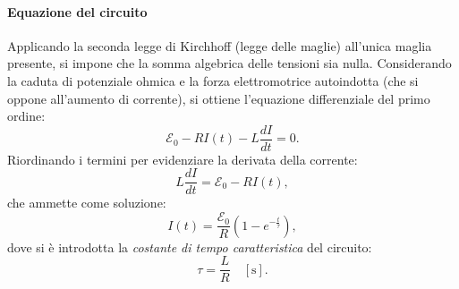 \documentclass[a4paper,11pt]{report}
\begin{document}
\begin{center}

\end{center}

\paragraph{Equazione del circuito}
Applicando la seconda legge di Kirchhoff (legge delle maglie) all'unica maglia presente, si impone che la somma algebrica delle tensioni sia nulla. Considerando la caduta di potenziale ohmica e la forza elettromotrice autoindotta (che si oppone all'aumento di corrente), si ottiene l'equazione differenziale del primo ordine:
\begin{equation}
\mathcal{E}_0 - R I(t) - L \frac{dI}{dt} = 0.
\end{equation}
Riordinando i termini per evidenziare la derivata della corrente:
\begin{equation}
L \frac{dI}{dt} = \mathcal{E}_0 - R I(t),
\end{equation}
che ammette come soluzione:
\begin{equation}
I(t) = \frac{\mathcal{E}_0}{R} \left( 1 - e^{-\frac{t}{\tau}} \right),
\end{equation}
dove si è introdotta la \textit{costante di tempo caratteristica} del circuito:
\begin{equation}
\tau = \frac{L}{R} \quad [\si{\second}].
\end{equation}
\end{document}
